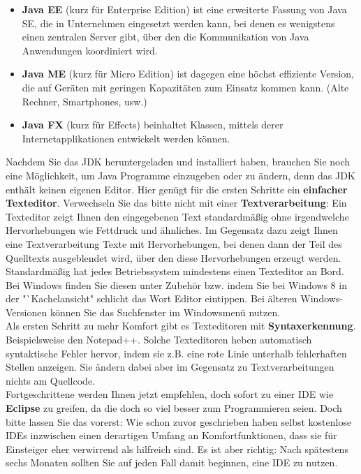 \begin{itemize}
\begin{itemize}
		\item \textbf{Java EE} (kurz für Enterprise Edition) ist eine erweiterte Fassung von Java SE, die in Unternehmen eingesetzt werden kann, bei denen es wenigstens einen zentralen Server gibt, über den die Kommunikation von Java Anwendungen koordiniert wird.
		\item \textbf{Java ME} (kurz für Micro Edition) ist dagegen eine höchst effiziente Version, die auf Geräten mit geringen Kapazitäten zum Einsatz kommen kann. (Alte Rechner, Smartphones, usw.)
		\item \textbf{Java FX} (kurz für Effects) beinhaltet Klassen, mittels derer Internetapplikationen entwickelt werden können.
	\end{itemize}
\end{itemize}

Nachdem Sie das JDK heruntergeladen und installiert haben, brauchen Sie noch eine Möglichkeit, um Java Programme einzugeben oder zu ändern, denn das JDK enthält keinen eigenen Editor. Hier genügt für die ersten Schritte ein \textbf{einfacher Texteditor}. Verwechseln Sie das bitte nicht mit einer \textbf{Textverarbeitung}: Ein Texteditor zeigt Ihnen den eingegebenen Text standardmäßig ohne irgendwelche Hervorhebungen wie Fettdruck und ähnliches. Im Gegensatz dazu zeigt Ihnen eine Textverarbeitung Texte mit Hervorhebungen, bei denen dann der Teil des Quelltexts ausgeblendet wird, über den diese Hervorhebungen erzeugt werden.\\

Standardmäßig hat jedes Betriebssystem mindestens einen Texteditor an Bord. Bei Windows finden Sie diesen unter Zubehör bzw. indem Sie bei Windows 8 in der "`Kachelansicht" schlicht das Wort Editor eintippen. Bei älteren Windows-Versionen können Sie das Suchfenster im Windowsmenü nutzen.\\

Als ersten Schritt zu mehr Komfort gibt es Texteditoren mit \textbf{Syntaxerkennung}. Beispielsweise den Notepad++. Solche Texteditoren heben automatisch syntaktische Fehler hervor, indem sie z.B. eine rote Linie unterhalb fehlerhaften Stellen anzeigen. Sie ändern dabei aber im Gegensatz zu Textverarbeitungen nichts am Quellcode.\\

Fortgeschrittene werden Ihnen jetzt empfehlen, doch sofort zu einer IDE wie \textbf{Eclipse} zu greifen, da die doch so viel besser zum Programmieren seien. Doch bitte lassen Sie das vorerst: Wie schon zuvor geschrieben haben selbst kostenlose IDEs inzwischen einen derartigen Umfang an Komfortfunktionen, dass sie für Einsteiger eher verwirrend als hilfreich sind. Es ist aber richtig: Nach spätestens sechs Monaten sollten Sie auf jeden Fall damit beginnen, eine IDE zu nutzen.

